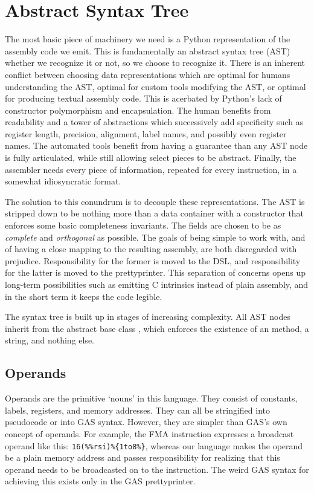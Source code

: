 \section{Abstract Syntax Tree}

The most basic piece of machinery we need is a Python representation of the assembly code we emit. This is fundamentally an abstract syntax tree (AST) whether we recognize it or not, so we choose to recognize it. There is an inherent conflict between choosing data representations which are optimal for humans understanding the AST, optimal for custom tools modifying the AST, or optimal for producing textual assembly code. This is acerbated by Python's lack of constructor polymorphism and encapsulation. The human benefits from readability and a tower of abstractions which successively add specificity such as register length, precision, alignment, label names, and possibly even register names. The automated tools benefit from having a guarantee than any AST node is fully articulated, while still allowing select pieces to be abstract. Finally, the assembler needs every piece of information, repeated for every instruction, in a somewhat idiosyncratic format.

The solution to this conundrum is to decouple these representations. The AST is stripped down to be nothing more than a data container with a constructor that enforces some basic completeness invariants. The fields are chosen to be as \emph{complete} and \emph{orthogonal} as possible. The goals of being simple to work with, and of having a close mapping to the resulting assembly, are both disregarded with prejudice. Responsibility for the former is moved to the DSL, and responsibility for the latter is moved to the prettyprinter. This separation of concerns opens up long-term possibilities such as emitting C intrinsics instead of plain assembly, and in the short term it keeps the code legible.

The syntax tree is built up in stages of increasing complexity. All AST nodes inherit from the abstract base class , which enforces the existence of an  method, a  string, and nothing else. 

\subsection{Operands}
Operands are the primitive `nouns' in this language. They consist of constants, labels, registers, and memory addresses. They can all be stringified into pseudocode or into GAS syntax. However, they are simpler than GAS's own concept of operands. For example, the FMA instruction expresses a broadcast operand like this: \verb|16(%%rsi)%{1to8%}|, whereas our language makes the operand be a plain memory address  and passes responsibility for realizing that this operand needs to be broadcasted on to the  instruction. The weird GAS syntax for achieving this exists only in the GAS prettyprinter.

